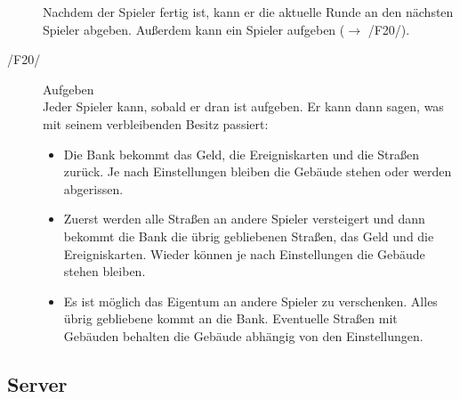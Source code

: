 \documentclass[a4paper,10pt]{article}
\begin{document}
\begin{description}
Nachdem der Spieler fertig ist, kann er die aktuelle Runde an den nächsten Spieler abgeben. Außerdem kann ein Spieler aufgeben ($\rightarrow$ /F20/).
\item[/F20/] Aufgeben \\
Jeder Spieler kann, sobald er dran ist aufgeben. Er kann dann sagen, was mit seinem verbleibenden Besitz passiert:
\begin{itemize}
\item Die Bank bekommt das Geld, die Ereigniskarten und die Straßen zurück. Je nach Einstellungen bleiben die Gebäude stehen oder werden abgerissen.
\item Zuerst werden alle Straßen an andere Spieler versteigert und dann bekommt die Bank die übrig gebliebenen Straßen, das Geld und die Ereigniskarten. Wieder können je nach Einstellungen die Gebäude stehen bleiben.
\item Es ist möglich das Eigentum an andere Spieler zu verschenken. Alles übrig gebliebene kommt an die Bank. Eventuelle Straßen mit Gebäuden behalten die Gebäude abhängig von den Einstellungen.
\end{itemize}
\end{description}

\subsection{Server}
\end{document}

